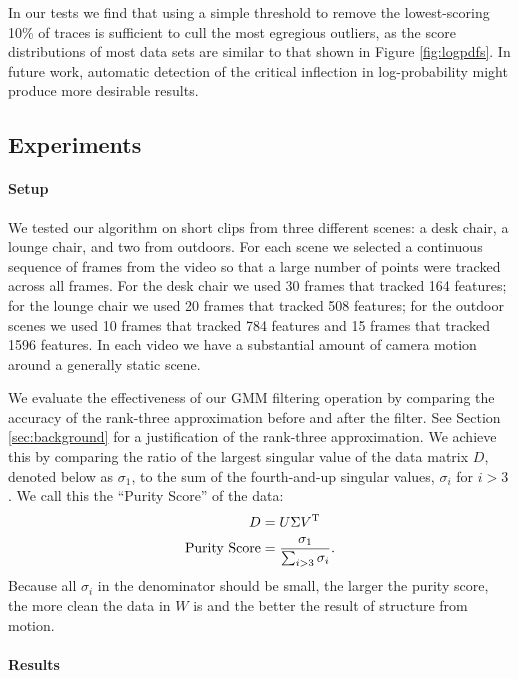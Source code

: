 In our tests we find that using a simple threshold to remove the lowest-scoring
10\% of traces is sufficient to cull the most egregious outliers, as the score
distributions of most data sets are similar to that shown in Figure
\ref{fig:logpdfs}.  In future work, automatic detection of the critical
inflection in log-probability might produce more desirable results.


\subsection{Experiments} %
\label{sub:Experiments}

\paragraph{Setup} 
We tested our algorithm on short clips from three different scenes: 
a desk chair, a lounge chair, and two from outdoors.  For each scene we selected a
continuous sequence of frames from the video so that a large number of points were tracked
across all frames.  For the desk chair we used 30
frames that tracked 164 features; for the lounge chair we used 20 frames that
tracked 508 features; for the outdoor scenes we used 10 frames that tracked
784 features and 15 frames that tracked 1596 features.  In each video we have a substantial
amount of camera motion around a generally static scene.

We evaluate the effectiveness of our GMM filtering operation by comparing the
accuracy of the rank-three approximation before and after the filter.  See
Section \ref{sec:background} for a justification of the rank-three
approximation.  We achieve this by comparing the ratio of the largest singular
value of the data matrix $D$, denoted below as $\sigma_1$, to the sum of the
fourth-and-up singular values, $\sigma_i$ for $i > 3$.
We call this the ``Purity Score'' of the data: 
\begin{align}
	D &= U\Sigma V^{\rm T} \\
	{\rm Purity\ Score} &= \frac{\sigma_1}{\sum_{i > 3} \sigma_i}.
\end{align}
Because all $\sigma_i$ in the denominator should be small, the larger the
purity score, the more clean the data in $W$ is and the better the result of
structure from motion.

\paragraph{Results} 

